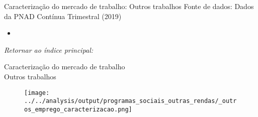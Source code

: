\begin{frame}[label=_outros_emprego]{Caracterização do mercado de trabalho:  Outros trabalhos}
{\footnotesize Fonte de dados: Dados da PNAD Contínua Trimestral (2019)}

\begin{itemize}
\item{
	\hyperlink{_outros_emprego_caracterizacao}{}
	} 	

\end{itemize}
\begin{small}
\textit{Retornar ao índice principal: \hyperlink{indice_principal}{} }
\end{small}
\end{frame}


\begin{frame}[label=_outros_emprego_caracterizacao]{{\small Caracterização do mercado de trabalho \\  Outros trabalhos}}
\textit{\hyperlink{_outros_emprego}{}}
\begin{figure}
  \centering
  \texttt{[image: ../../analysis/output/programas\_sociais\_outras\_rendas/\_outros\_emprego\_caracterizacao.png]}
  \caption{}
  \label{fig:_outros_emprego_caracterizacao}
\end{figure}
\end{frame}


